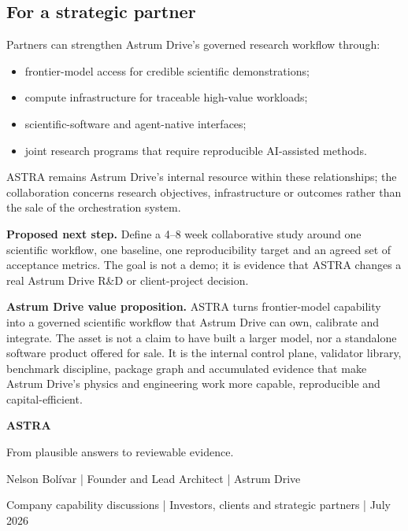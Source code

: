 \documentclass[10pt,a4paper]{article}
\begin{document}
\subsection*{For a strategic partner}

Partners can strengthen Astrum Drive's governed research workflow through:

\begin{itemize}
  \item frontier-model access for credible scientific demonstrations;
  \item compute infrastructure for traceable high-value workloads;
  \item scientific-software and agent-native interfaces;
  \item joint research programs that require reproducible AI-assisted methods.
\end{itemize}

ASTRA remains Astrum Drive's internal resource within these relationships; the
collaboration concerns research objectives, infrastructure or outcomes rather than
the sale of the orchestration system.

\begin{keybox}
\textbf{Proposed next step.} Define a 4--8 week collaborative study around one
scientific workflow, one baseline, one reproducibility target and an agreed set of
acceptance metrics. The goal is not a demo; it is evidence that ASTRA changes a real
Astrum Drive R\&D or client-project decision.
\end{keybox}

\begin{plainbox}
\textbf{Astrum Drive value proposition.} ASTRA turns frontier-model capability into a
governed scientific workflow that Astrum Drive can own, calibrate and integrate. The
asset is not a claim to have built a larger model, nor a standalone software product
offered for sale. It is the internal control plane, validator library, benchmark
discipline, package graph and accumulated evidence that make Astrum Drive's physics
and engineering work more capable, reproducible and capital-efficient.
\end{plainbox}

\vfill
\begin{center}
{\Large\bfseries\color{navy}ASTRA}\par
\vspace{2mm}
{\large\color{tealblue}From plausible answers to reviewable evidence.}\par
\vspace{8mm}
{\small Nelson Bolívar | Founder and Lead Architect | Astrum Drive}\par
{\small Company capability discussions | Investors, clients and strategic partners | July 2026}
\end{center}
\end{document}
